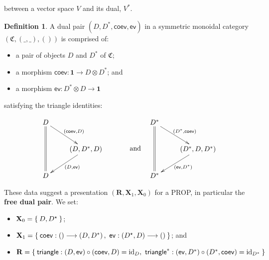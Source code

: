 \documentclass[pra,floatfix,
amsmath,superscriptaddress, 12pt]{article}
\theoremstyle{definition}
\newtheorem{defn}[thm]{Definition}
\newcommand{\evmap}{\mathsf{ev}}
\newcommand{\coev}{\mathsf{coev}}
\DeclareMathOperator{\id}{{\normalfont\text{id}}}
\begin{document}
between a vector space $V$ and its dual, $V^*$.

\begin{defn}
A dual pair $\left(D,D^{*},\coev,\evmap\right)$ in a symmetric monoidal
category $\left(\mathfrak{C},\left(\_,\_\right),\left(\right)\right)$
is comprised of:
\begin{itemize}
\item a pair of objects $D$ and $D^{*}$ of $\mathfrak{C}$;
\item a morphism $\coev:\mathbf{1}\longrightarrow D\otimes D^{*}$; and
\item a morphism $\evmap:D^{*}\otimes D\longrightarrow\mathbf{1}$
\end{itemize}
satisfying the triangle identities:

\begin{align*}
    \vcenter{\vbox{\xymatrix{
        D\ar@{=}[dd]
        \ar[dr]^{\left(\coev,D\right)}
            \\
            &
            \left(D,D^{*},D\right)
            \ar[dl]^{\left(D,\evmap\right)}
                \\
        D
    }}}
        &
        \mathrm{ \ \ \ \ \ \ \ \ \ \  \ and }
            &
            \vcenter{\vbox{\xymatrix{
                D^{*}
                \ar@{=}[dd]
                \ar[dr]^{\left(D^{*},\coev\right)}
                    \\
                    &
                    \left(D^{*},D,D^{*}\right)
                    \ar[dl]^{\left(\evmap,D^{*}\right)}
                        \\
                D^{*}
    }}}
    \end{align*}
\end{defn}

These data suggest a presentation $(\mathbf{R},\mathbf{X}_1,\mathbf{X}_0)$ for a \textsf{PROP}, in particular the \textbf{free dual pair}. We set:

\begin{itemize}
    \item $\mathbf{X}_0 = \Set{D,D^\star}$;
    \item $\mathbf{X}_1 = \Set{
        \coev:\left(\right) \longrightarrow \left(D,D^{*}\right), \
        \evmap:\left(D^{\star},D\right)\longrightarrow \left(\right)
    }$; and
    \item $\mathbf{R} =
    \Set{
        \mathsf{triangle}:(D,\evmap) \circ (\coev,D) = \id_{D}, \ 
        \mathsf{triangle}^{*}:(\evmap,D^*)\circ(D^*,\coev) = \id_{D^*}
    }$
\end{itemize}
\end{document}
